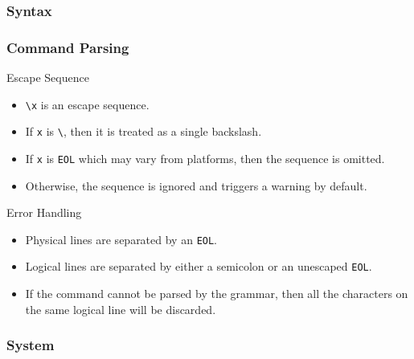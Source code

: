 \documentclass[10pt]{beamer}
\begin{document}
\subsubsection{Syntax}

\begin{frame}[t] \frametitle{Command Parsing}

	\begin{block}{Escape Sequence}
		\begin{itemize}
			\item \texttt{\textbackslash x} is an escape sequence.
			\item If \texttt{x} is \texttt{\textbackslash}, then it is treated as a single backslash.
			\item If \texttt{x} is \texttt{EOL} which may vary from platforms, then the sequence is omitted.
			\item Otherwise, the sequence is ignored and triggers a warning by default.
		\end{itemize}
	\end{block}

	\begin{block}{Error Handling}
		\begin{itemize}
			\item Physical lines are separated by an \texttt{EOL}.
			\item Logical lines are separated by either a semicolon or an unescaped \texttt{EOL}.
			\item If the command cannot be parsed by the grammar, then all the characters on the same logical line will be discarded.
		\end{itemize}
	\end{block}

\end{frame}

\subsubsection{System}
\end{document}
